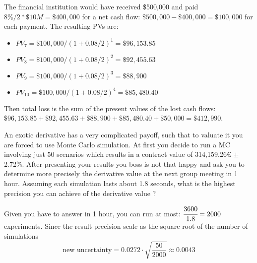 \documentclass[12pt,a4paper]{exam}
\begin{document}
\begin{questions}
\begin{solution}
\begin{itemize}
The financial institution would have received \$500,000 and paid $8\%/2 * \$10 M = \$400,000$ for a net cash flow: $\$500,000 - \$400,000 = \$100,000$ for each payment. The resulting PVs are:
\begin{itemize}
\item $PV_7 = \$100,000 / (1 + 0.08/2)^1 = \$96,153.85$
\item $PV_8 = \$100,000 / (1 + 0.08/2)^2 = \$92,455.63$
\item $PV_{9} = \$100,000 / (1 + 0.08/2)^3 = \$88,900$
\item $PV_{10} = \$100,000 / (1 + 0.08/2)^4 = \$85,480.40$
\end{itemize}
\end{itemize}

Then total loss is the sum of the present values of the lost cash flows: $\$96,153.85 + \$92,455.63 + \$88,900 + \$85,480.40 + \$50,000 = \$412,990$.
\end{solution}

\question An exotic derivative has a very complicated payoff, such that to valuate it you are forced to use Monte Carlo simulation. 
At first you decide to run a MC involving just 50 scenarios which results in a contract value of 314,159.26€ $\pm$ 2.72\%. After presenting your results you boss is not that happy and ask you to determine more precisely the derivative value at the next group meeting in 1 hour. Assuming each simulation lasts about 1.8 seconds, what is the highest precision you can achieve of the derivative value ?
\makeemptybox{5cm}

\begin{solution}
Given you have to answer in 1 hour, you can run at most: $\cfrac{3600}{1.8}=2000$ experiments. Since the result precision scale as the square root of the number of simulations
\begin{equation*}
\textrm{new uncertainty} = 0.0272 \cdot \sqrt{\frac{50}{2000}} \approx 0.0043
\end{equation*}
\end{solution}


\end{questions}
\end{document}
